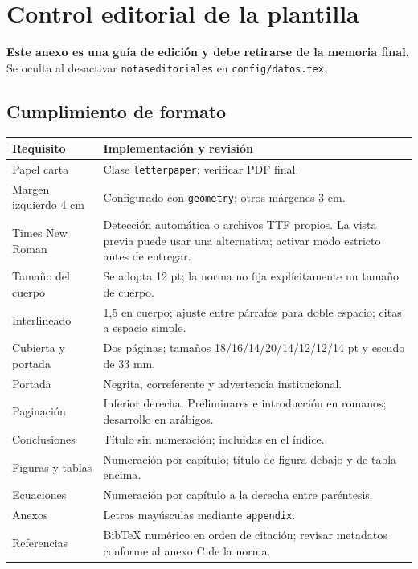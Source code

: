 \chapter{Control editorial de la plantilla}
\textbf{Este anexo es una guía de edición y debe retirarse de la memoria final.} Se oculta al desactivar \texttt{notaseditoriales} en \texttt{config/datos.tex}.

\section{Cumplimiento de formato}
\begin{longtable}{p{4.5cm}p{8.7cm}}
\toprule\textbf{Requisito} & \textbf{Implementación y revisión}\\\midrule\endhead
Papel carta & Clase \texttt{letterpaper}; verificar PDF final.\\
Margen izquierdo 4 cm & Configurado con \texttt{geometry}; otros márgenes 3 cm.\\
Times New Roman & Detección automática o archivos TTF propios. La vista previa puede usar una alternativa; activar modo estricto antes de entregar.\\
Tamaño del cuerpo & Se adopta 12 pt; la norma no fija explícitamente un tamaño de cuerpo.\\
Interlineado & 1,5 en cuerpo; ajuste entre párrafos para doble espacio; citas a espacio simple.\\
Cubierta y portada & Dos páginas; tamaños 18/16/14/20/14/12/12/14 pt y escudo de 33 mm.\\
Portada & Negrita, correferente y advertencia institucional.\\
Paginación & Inferior derecha. Preliminares e introducción en romanos; desarrollo en arábigos.\\
Conclusiones & Título sin numeración; incluidas en el índice.\\
Figuras y tablas & Numeración por capítulo; título de figura debajo y de tabla encima.\\
Ecuaciones & Numeración por capítulo a la derecha entre paréntesis.\\
Anexos & Letras mayúsculas mediante \texttt{appendix}.\\
Referencias & BibTeX numérico en orden de citación; revisar metadatos conforme al anexo C de la norma.\\
\bottomrule
\end{longtable}

